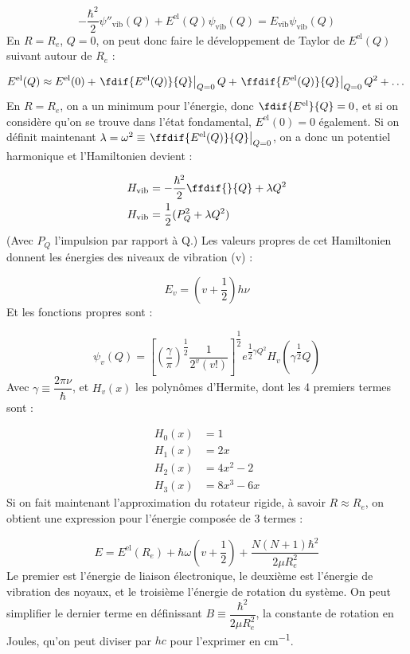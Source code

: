 \[ -\dfrac{\hbar^2}{2}\psi''_\text{vib}(Q) + E^\text{el}(Q)\psi_\text{vib}(Q) = E_\text{vib}\psi_\text{vib}(Q) \]
En $R = R_e$, $Q = 0$, on peut donc faire le développement de Taylor de $E^\text{el}(Q)$ suivant autour de $R_e$ :


\[
E^\text{el}(Q) \approx E^\text{el}(0) + \left. \fdif{E^\text{el}(Q)}{Q}\right|_{Q = 0}Q + \left. \ffdif{E^\text{el}(Q)}{Q}\right|_{Q = 0}Q^2 + \dots
\]
En $R = R_e$, on a un minimum pour l'énergie, donc $\fdif{E^\text{el}}{Q} = 0$, et si on considère qu'on se trouve dans l'état fondamental, $E^\text{el}(0) = 0$ également. Si on définit maintenant $\lambda = \omega^2 \equiv \left. \ffdif{E^\text{el}(Q)}{Q}\right|_{Q = 0} $, on a donc un potentiel harmonique et l'Hamiltonien devient :


\begin{align*}
    H_\text{vib} &= -\dfrac{\hbar^2}{2}\ffdif{}{Q} +\lambda Q^2\\
    H_\text{vib} &= \dfrac{1}{2}(P^2_Q + \lambda Q^2)
\end{align*}
(Avec $P_Q$ l'impulsion par rapport à Q.) Les valeurs propres de cet Hamiltonien donnent les énergies des niveaux de vibration (v) :


\[ E_v = (v + \dfrac{1}{2})h\nu \]
Et les fonctions propres sont :


\[
\psi_v(Q) = \left[(\dfrac{\gamma}{\pi})^{\dfrac{1}{2}}\dfrac{1}{2^v(v!)} \right]^{\dfrac{1}{2}}e^{\dfrac{1}{2}\gamma Q^2}H_v(\gamma^{\dfrac{1}{2}}Q)
\]
Avec $\gamma \equiv \dfrac{2\pi \nu}{\hbar}$, et $H_v(x)$ les polynômes d'Hermite, dont les 4 premiers termes sont :


\begin{align*}
    H_0(x) &= 1\\
    H_1(x) &= 2x\\
    H_2(x) &= 4x^2-2\\
    H_3(x) &= 8x^3-6x
\end{align*}
Si on fait maintenant l'approximation du rotateur rigide, à savoir $R\approx R_e$, on obtient une expression pour l'énergie composée de 3 termes :


\[ E = E^\text{el}(R_e) + \hbar\omega(v+\dfrac{1}{2}) + \dfrac{N(N+1)\hbar^2}{2\mu R_e^2} \]
Le premier est l'énergie de liaison électronique, le deuxième est l'énergie de vibration des noyaux, et le troisième l'énergie de rotation du système. On peut simplifier le dernier terme en définissant $B \equiv \dfrac{\hbar^2}{2\mu R_e^2}$, la constante de rotation en Joules, qu'on peut diviser par $hc$ pour l'exprimer en \si{cm^{-1}}.


